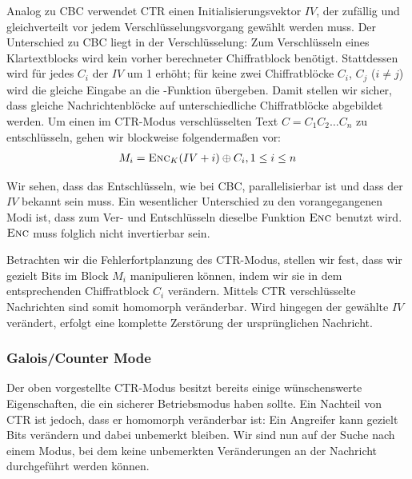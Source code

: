 Analog zu CBC verwendet CTR einen Initialisierungsvektor $IV$, der zufällig und gleichverteilt vor jedem Verschlüsselungsvorgang gewählt werden muss. Der Unterschied zu CBC liegt in der Verschlüsselung: Zum Verschlüsseln eines Klartextblocks wird kein vorher berechneter Chiffratblock benötigt. Stattdessen wird für jedes $C_i$ der $IV$ um 1 erhöht; für keine zwei Chiffratblöcke $C_i$, $C_j$ ($i \neq j$) wird die gleiche Eingabe an die \enc-Funktion übergeben. Damit stellen wir sicher, dass gleiche Nachrichtenblöcke auf unterschiedliche Chiffratblöcke abgebildet werden. Um einen im CTR-Modus verschlüsselten Text $C = C_1C_2 \dots C_n$ zu entschlüsseln, gehen wir blockweise folgendermaßen vor:
\begin{align*}
	M_i = \textsc{Enc}_{K}(IV + i) \oplus C_i{,}\, 1 \leq i \leq n
\end{align*}

Wir sehen, dass das Entschlüsseln, wie bei CBC, parallelisierbar ist und dass der $IV$ bekannt sein muss. Ein wesentlicher Unterschied zu den vorangegangenen Modi ist, dass zum Ver- und Entschlüsseln dieselbe Funktion $\textsc{Enc}$ benutzt wird. $\textsc{Enc}$ muss folglich nicht invertierbar sein.

Betrachten wir die Fehlerfortplanzung des CTR-Modus, stellen wir fest, dass wir gezielt Bits im Block $M_i$ manipulieren können, indem wir sie in dem entsprechenden Chiffratblock $C_i$ verändern. Mittels CTR verschlüsselte Nachrichten sind somit homomorph veränderbar. Wird hingegen der gewählte $IV$ verändert, erfolgt eine komplette Zerstörung der ursprünglichen Nachricht. 

\subsubsection{Galois/Counter Mode}
Der oben vorgestellte CTR-Modus besitzt bereits einige wünschenswerte Eigenschaften, die ein sicherer Betriebsmodus haben sollte. Ein Nachteil von CTR ist jedoch, dass er homomorph veränderbar ist: Ein Angreifer kann gezielt Bits verändern und dabei unbemerkt bleiben. Wir sind nun auf der Suche nach einem Modus, bei dem keine unbemerkten Veränderungen an der Nachricht durchgeführt werden können.

